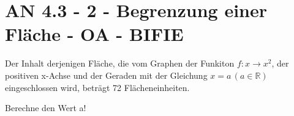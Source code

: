 \section{AN 4.3 - 2 - Begrenzung einer Fläche - OA - BIFIE}

\begin{beispiel}[AN 4.3]{1} %
				Der Inhalt derjenigen Fläche, die vom Graphen der Funkiton $f:x\rightarrow x^2$, der positiven x-Achse und der Geraden mit der Gleichung $x=a\,(a\in\mathbb{R})$ eingeschlossen wird, beträgt 72 Flächeneinheiten.
				
				Berechne den Wert a!
				
\end{beispiel}